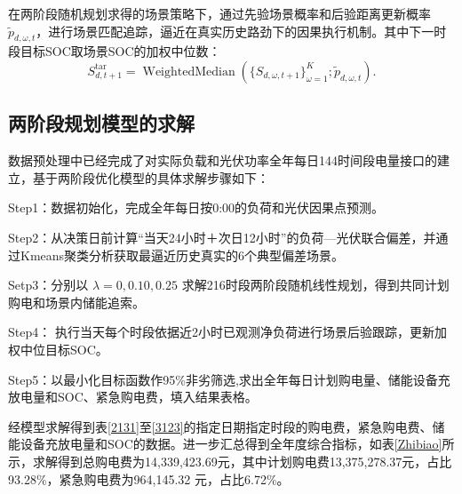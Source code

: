 \documentclass{cumcm2026}
\begin{document}
在两阶段随机规划求得的场景策略下，通过先验场景概率和后验距离更新概率$\widetilde p_{d,\omega,t}$，进行场景匹配追踪，逼近在真实历史路劲下的因果执行机制。其中下一时段目标SOC取场景SOC的加权中位数：$$
S^{\mathrm{tar}}_{d,t+1}
=\operatorname{WeightedMedian}
\left(\{S_{d,\omega,t+1}\}_{\omega=1}^{K};\widetilde p_{d,\omega,t}\right).
$$



\subsection{两阶段规划模型的求解}

数据预处理中已经完成了对实际负载和光伏功率全年每日144时间段电量接口的建立，基于两阶段优化模型的具体求解步骤如下：

Step1：数据初始化，完成全年每日按0:00的负荷和光伏因果点预测。

Step2：从决策日前计算“当天24小时＋次日12小时”的负荷—光伏联合偏差，并通过Kmeans聚类分析获取最逼近历史真实的6个典型偏差场景。

Setp3：分别以 $\lambda=0,0.10,0.25$ 求解216时段两阶段随机线性规划，得到共同计划购电和场景内储能追索。

Step4： 执行当天每个时段依据近2小时已观测净负荷进行场景后验跟踪，更新加权中位目标SOC。

Step5：以最小化目标函数作95\%非劣筛选,求出全年每日计划购电量、储能设备充放电量和SOC、紧急购电费，填入结果表格。

经模型求解得到表\ref{2131}至\ref{3123}的指定日期指定时段的购电费，紧急购电费、储能设备充放电量和SOC的数据。进一步汇总得到全年度综合指标，如表\ref{Zhibiao}所示，求解得到总购电费为14,339,423.69元，其中计划购电费13,375,278.37元，占比93.28\%，紧急购电费为964,145.32 元，占比6.72\%。
\end{document}
